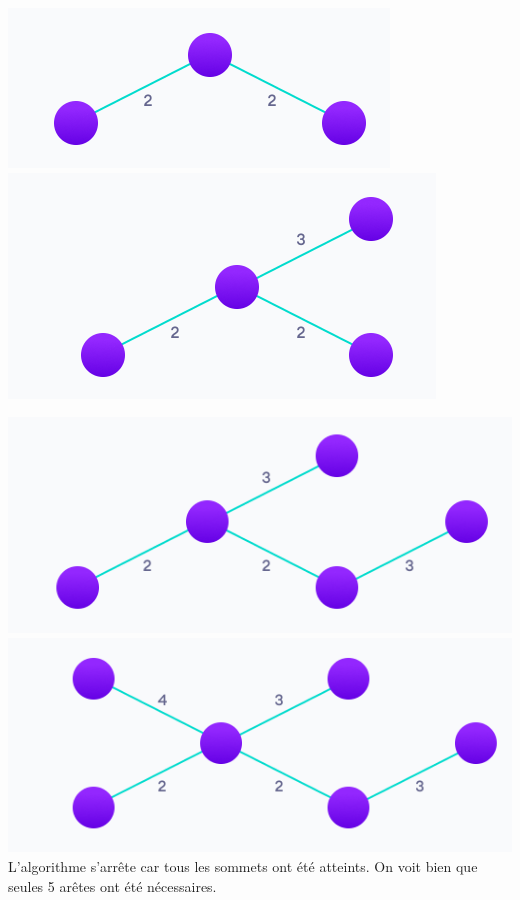 \begin{Exercice}[5 minutes]
\begin{solution}
        \includegraphics[]{resources/K2.PNG}\\
        \includegraphics[]{resources/K3.PNG}\\
    \end{solution}
    \begin{solution}
        \includegraphics[]{resources/K4.PNG}\\
        \includegraphics[]{resources/K5.PNG}\\
        L'algorithme s'arrête car tous les sommets ont été atteints. On voit bien que seules 5 arêtes ont été nécessaires.
    \end{solution}
\end{Exercice}
